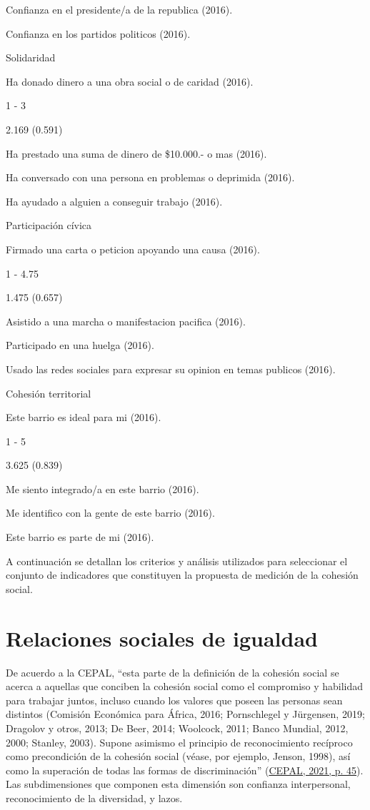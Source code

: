 \documentclass[
  12pt,
]{book}
\begin{document}
Confianza en el presidente/a de la republica (2016).

Confianza en los partidos politicos (2016).

Solidaridad

Ha donado dinero a una obra social o de caridad (2016).

1 - 3

2.169 (0.591)

Ha prestado una suma de dinero de \$10.000.- o mas (2016).

Ha conversado con una persona en problemas o deprimida (2016).

Ha ayudado a alguien a conseguir trabajo (2016).

Participación cívica

Firmado una carta o peticion apoyando una causa (2016).

1 - 4.75

1.475 (0.657)

Asistido a una marcha o manifestacion pacifica (2016).

Participado en una huelga (2016).

Usado las redes sociales para expresar su opinion en temas publicos (2016).

Cohesión territorial

Este barrio es ideal para mi (2016).

1 - 5

3.625 (0.839)

Me siento integrado/a en este barrio (2016).

Me identifico con la gente de este barrio (2016).

Este barrio es parte de mi (2016).

A continuación se detallan los criterios y análisis utilizados para seleccionar el conjunto de indicadores que constituyen la propuesta de medición de la cohesión social.

\hypertarget{relaciones-sociales-de-igualdad}{%
\section{Relaciones sociales de igualdad}\label{relaciones-sociales-de-igualdad}}

De acuerdo a la CEPAL, ``esta parte de la definición de la cohesión social se acerca a aquellas que conciben la cohesión social como el compromiso y habilidad para trabajar juntos, incluso cuando los valores que poseen las personas sean distintos (Comisión Económica para África, 2016; Pornschlegel y Jürgensen, 2019; Dragolov y otros, 2013; De Beer, 2014; Woolcock, 2011; Banco Mundial, 2012, 2000; Stanley, 2003). Supone asimismo el principio de reconocimiento recíproco como precondición de la cohesión social (véase, por ejemplo, Jenson, 1998), así como la superación de todas las formas de discriminación'' (\protect\hyperlink{ref-cepal_cohesion_2021}{CEPAL, 2021, p. 45}). Las subdimensiones que componen esta dimensión son confianza interpersonal, reconocimiento de la diversidad, y lazos.
\end{document}

